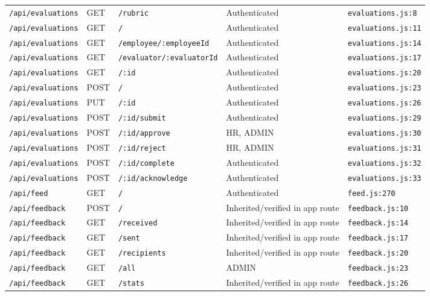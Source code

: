 \begin{landscape}
\begin{longtable}{p{}p{}p{}p{}p{}}
\texttt{/api/evaluations} & GET & \texttt{/rubric} & Authenticated & \texttt{evaluations.js:8}\\
\texttt{/api/evaluations} & GET & \texttt{/} & Authenticated & \texttt{evaluations.js:11}\\
\texttt{/api/evaluations} & GET & \texttt{/employee/:employeeId} & Authenticated & \texttt{evaluations.js:14}\\
\texttt{/api/evaluations} & GET & \texttt{/evaluator/:evaluatorId} & Authenticated & \texttt{evaluations.js:17}\\
\texttt{/api/evaluations} & GET & \texttt{/:id} & Authenticated & \texttt{evaluations.js:20}\\
\texttt{/api/evaluations} & POST & \texttt{/} & Authenticated & \texttt{evaluations.js:23}\\
\texttt{/api/evaluations} & PUT & \texttt{/:id} & Authenticated & \texttt{evaluations.js:26}\\
\texttt{/api/evaluations} & POST & \texttt{/:id/submit} & Authenticated & \texttt{evaluations.js:29}\\
\texttt{/api/evaluations} & POST & \texttt{/:id/approve} & HR,  ADMIN & \texttt{evaluations.js:30}\\
\texttt{/api/evaluations} & POST & \texttt{/:id/reject} & HR,  ADMIN & \texttt{evaluations.js:31}\\
\texttt{/api/evaluations} & POST & \texttt{/:id/complete} & Authenticated & \texttt{evaluations.js:32}\\
\texttt{/api/evaluations} & POST & \texttt{/:id/acknowledge} & Authenticated & \texttt{evaluations.js:33}\\
\texttt{/api/feed} & GET & \texttt{/} & Authenticated & \texttt{feed.js:270}\\
\texttt{/api/feedback} & POST & \texttt{/} & Inherited/verified in app route & \texttt{feedback.js:10}\\
\texttt{/api/feedback} & GET & \texttt{/received} & Inherited/verified in app route & \texttt{feedback.js:14}\\
\texttt{/api/feedback} & GET & \texttt{/sent} & Inherited/verified in app route & \texttt{feedback.js:17}\\
\texttt{/api/feedback} & GET & \texttt{/recipients} & Inherited/verified in app route & \texttt{feedback.js:20}\\
\texttt{/api/feedback} & GET & \texttt{/all} & ADMIN & \texttt{feedback.js:23}\\
\texttt{/api/feedback} & GET & \texttt{/stats} & Inherited/verified in app route & \texttt{feedback.js:26}\\

\end{longtable}
\end{landscape}
